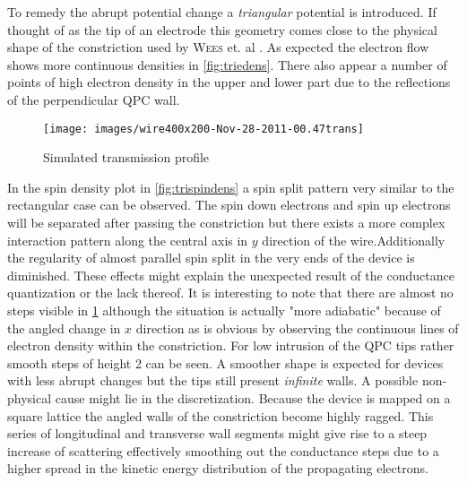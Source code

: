 To remedy the abrupt potential change a \emph{triangular} potential is introduced. If thought of as the tip of an electrode this geometry comes close to the physical  shape of the constriction used by \textsc{Wees} et. al \cite{PhysRevLett.60.848}. As expected the electron flow shows more continuous densities in \cref{fig:triedens}. There also appear a number of points of high electron density in the upper and lower part due to the reflections of the perpendicular QPC wall.\par
\begin{figure}[h]
\centering
\texttt{[image: images/wire400x200-Nov-28-2011-00.47trans]}
\caption{Simulated transmission profile}\label{fig:tritrans}
\end{figure}
In the spin density plot in \cref{fig:trispindens} a spin split pattern very similar to the rectangular case can be observed. The spin down electrons and spin up electrons will be separated after passing the constriction but there exists a more complex interaction pattern along the central axis in $y$ direction of the wire.Additionally the regularity of almost parallel spin split in the very ends of the device is diminished. These effects might explain the unexpected result of the conductance quantization or the lack thereof.
It is interesting to note that there are almost no steps visible in \cref{fig:tritrans} although the situation is actually "more adiabatic" because of the angled change in $x$ direction as is obvious by observing the continuous lines of electron density within the constriction. For low intrusion of the QPC tips rather smooth steps of height 2 can be seen. A smoother shape is expected for devices with less abrupt changes but the tips still present \emph{infinite} walls. A possible non-physical cause might lie in the discretization. Because the device is mapped on a square lattice the angled walls of the constriction become highly ragged. This series of longitudinal and transverse wall segments might give rise to a steep increase of scattering effectively smoothing out the conductance steps due to a higher spread in the kinetic energy distribution of the propagating electrons.
\FloatBarrier
